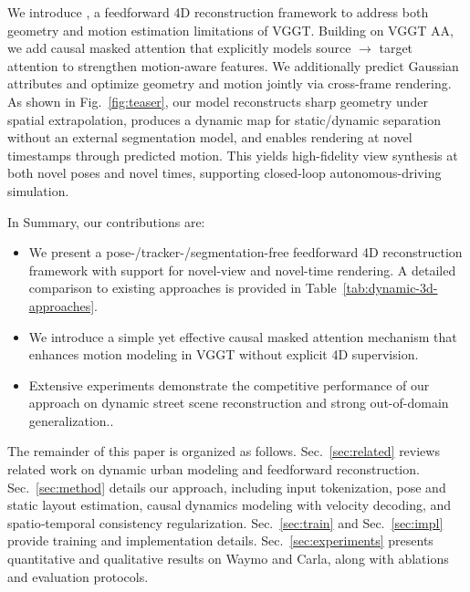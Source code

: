 We introduce \StreetForward, a feedforward 4D reconstruction framework to address both geometry and motion estimation limitations of VGGT. Building on VGGT AA, we add causal masked attention that explicitly models source $\to$ target attention to strengthen motion-aware features. We additionally predict Gaussian attributes and optimize geometry and motion jointly via cross-frame rendering. As shown in Fig.~\ref{fig:teaser}, our model reconstructs sharp geometry under spatial extrapolation, produces a dynamic map for static/dynamic separation without an external segmentation model, and enables rendering at novel timestamps through predicted motion. This yields high-fidelity view synthesis at both novel poses and novel times, supporting closed-loop autonomous-driving simulation.

In Summary, our contributions are:
\begin{itemize}
\item We present a pose-/tracker-/segmentation-free feedforward 4D reconstruction framework with support for novel-view and novel-time rendering.  A detailed comparison to existing approaches is provided in Table~\ref{tab:dynamic-3d-approaches}.
\item We introduce a simple yet effective causal masked attention mechanism that enhances motion modeling in VGGT without explicit 4D supervision.
\item Extensive experiments demonstrate the competitive performance of our approach on dynamic street scene reconstruction and strong out-of-domain generalization..
\end{itemize} 

The remainder of this paper is organized as follows. Sec.~\ref{sec:related} reviews related work on dynamic urban modeling and feedforward reconstruction. Sec.~\ref{sec:method} details our approach, including input tokenization, pose and static layout estimation, causal dynamics modeling with velocity decoding, and spatio‑temporal consistency regularization. 
Sec.~\ref{sec:train} and Sec.~\ref{sec:impl} provide training and implementation details.
Sec.~\ref{sec:experiments} presents quantitative and qualitative results on Waymo and Carla, along with ablations and evaluation protocols.
